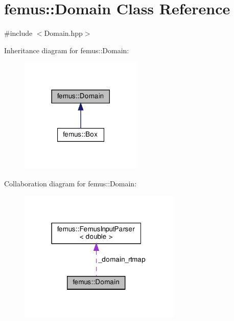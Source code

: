 \hypertarget{classfemus_1_1_domain}{}\section{femus\+:\+:Domain Class Reference}
\label{classfemus_1_1_domain}


{\ttfamily \#include $<$Domain.\+hpp$>$}



Inheritance diagram for femus\+:\+:Domain\+:
\nopagebreak
\begin{figure}[H]
\begin{center}
\leavevmode
\includegraphics[width=165pt]{classfemus_1_1_domain__inherit__graph}
\end{center}
\end{figure}


Collaboration diagram for femus\+:\+:Domain\+:
\nopagebreak
\begin{figure}[H]
\begin{center}
\leavevmode
\includegraphics[width=219pt]{classfemus_1_1_domain__coll__graph}
\end{center}
\end{figure}
